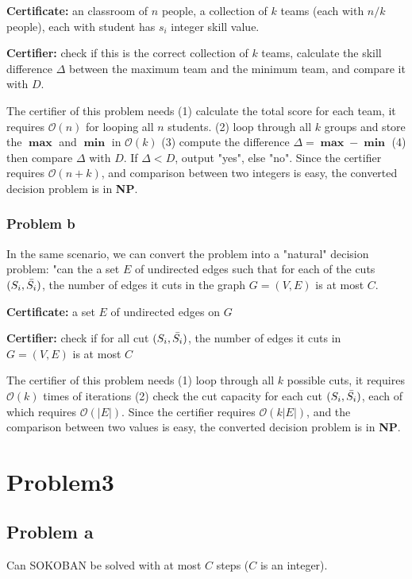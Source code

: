 \documentclass[openany]{article}
\begin{document}
\textbf{Certificate:} an classroom of $n$ people, a collection of $k$ teams (each with $n/k$ people), each with student has $s_i$ integer skill value.

\textbf{Certifier:} check if this is the correct collection of $k$ teams, calculate the skill difference $\Delta$ between the maximum team and the minimum team, and compare it with $D$.

The certifier of this problem needs (1) calculate the total score for each team, it requires $\mathcal{O}(n)$ for looping all $n$ students. (2) loop through all $k$ groups and store the $\mathbf{\max}$ and $\mathbf{\min}$ in $\mathcal{O}(k)$ (3) compute the difference $\Delta = \mathbf{\max} - \mathbf{\min}$ (4) then compare $\Delta$ with $D$. If $\Delta < D$, output "yes", else "no". Since the certifier requires $\mathcal{O}(n+k)$, and comparison between two integers is easy, the converted decision problem is in \textbf{NP}.

\subsubsection*{Problem b}
In the same scenario, we can convert the problem into a "natural" decision problem: "can the a set $E$ of undirected edges such that for each of the cuts $(S_i, \Bar{S_i})$, the number of edges it cuts in the graph $G=(V, E)$ is at most $C$.

\textbf{Certificate:} a set $E$ of undirected edges on $G$

\textbf{Certifier:} check if for all cut $(S_i,\Bar{S_i})$, the number of edges it cuts in $G=(V,E)$ is at most $C$

The certifier of this problem needs (1) loop through all $k$ possible cuts, it requires $\mathcal{O}(k)$ times of iterations (2) check the cut capacity for each cut $(S_i, \Bar{S_i})$, each of which requires $\mathcal{O}(|E|)$. Since the certifier requires $\mathcal{O}(k|E|)$, and the comparison between two values is easy, the converted decision problem is in \textbf{NP}.

\section*{Problem3}
\subsection*{Problem a}
Can SOKOBAN be solved with at most $C$ steps ($C$ is an integer).
\end{document}
